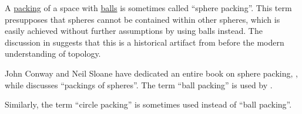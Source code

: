 \begin{remark}\label{rem:sphere_packing}
  A \hyperref[def:topological_space_packing]{packing} of a space with \hyperref[def:metric_space/ball]{balls} is sometimes called \enquote{sphere packing}. This term presupposes that spheres cannot be contained within other spheres, which is easily achieved without further assumptions by using balls instead. The discussion in \cite{MathOF:sphere_packing_vs_ball_packing} suggests that this is a historical artifact from before the modern understanding of topology.

  John Conway and Neil Sloane have dedicated an entire book on sphere packing, \cite{ConwaySloane1998SpherePackings}, while  discusses \enquote{packings of spheres}. The term \enquote{ball packing} is used by .

  Similarly, the term \enquote{circle packing} is sometimes used instead of \enquote{ball packing}.
\end{remark}

